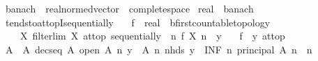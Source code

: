 \begin{isabellebody}
\isanewline
%
\endisadelimproof
\isanewline
{}\isamarkupfalse%
\ banach\ {\isacharequal}{\kern0pt}\ real{\isacharunderscore}{\kern0pt}normed{\isacharunderscore}{\kern0pt}vector\ {\isacharplus}{\kern0pt}\ complete{\isacharunderscore}{\kern0pt}space\isanewline
\isanewline
{}\isamarkupfalse%
\ real\ {\isacharcolon}{\kern0pt}{\isacharcolon}{\kern0pt}\ banach%
\isadelimproof
\ %
\endisadelimproof
%
\isatagproof
\isacommand{{\isachardot}{\kern0pt}{\isachardot}{\kern0pt}}\isamarkupfalse%
%
\endisatagproof
{\isafoldproof}%
%
\isadelimproof
%
\endisadelimproof
\isanewline
\isanewline
{}\isamarkupfalse%
\ tendsto{\isacharunderscore}{\kern0pt}at{\isacharunderscore}{\kern0pt}topI{\isacharunderscore}{\kern0pt}sequentially{\isacharcolon}{\kern0pt}\isanewline
\ \ \ f\ {\isacharcolon}{\kern0pt}{\isacharcolon}{\kern0pt}\ {\isachardoublequoteopen}real\ {\isasymRightarrow}\ {\isacharprime}{\kern0pt}b{\isacharcolon}{\kern0pt}{\isacharcolon}{\kern0pt}first{\isacharunderscore}{\kern0pt}countable{\isacharunderscore}{\kern0pt}topology{\isachardoublequoteclose}\isanewline
\ \ \ {\isacharasterisk}{\kern0pt}{\isacharcolon}{\kern0pt}\ {\isachardoublequoteopen}{\isasymAnd}X{\isachardot}{\kern0pt}\ filterlim\ X\ at{\isacharunderscore}{\kern0pt}top\ sequentially\ {\isasymLongrightarrow}\ {\isacharparenleft}{\kern0pt}{\isasymlambda}n{\isachardot}{\kern0pt}\ f\ {\isacharparenleft}{\kern0pt}X\ n{\isacharparenright}{\kern0pt}{\isacharparenright}{\kern0pt}\ {\isasymlonglonglongrightarrow}\ y{\isachardoublequoteclose}\isanewline
\ \ \ {\isachardoublequoteopen}{\isacharparenleft}{\kern0pt}f\ {\isasymlonglongrightarrow}\ y{\isacharparenright}{\kern0pt}\ at{\isacharunderscore}{\kern0pt}top{\isachardoublequoteclose}\isanewline
%
\isadelimproof
%
\endisadelimproof
%
\isatagproof
{}\isamarkupfalse%
\ {\isacharminus}{\kern0pt}\isanewline
\ \ \isamarkupfalse%
\ A\ \ A{\isacharcolon}{\kern0pt}\ {\isachardoublequoteopen}decseq\ A{\isachardoublequoteclose}\ {\isachardoublequoteopen}open\ {\isacharparenleft}{\kern0pt}A\ n{\isacharparenright}{\kern0pt}{\isachardoublequoteclose}\ {\isachardoublequoteopen}y\ {\isasymin}\ A\ n{\isachardoublequoteclose}\ {\isachardoublequoteopen}nhds\ y\ {\isacharequal}{\kern0pt}\ {\isacharparenleft}{\kern0pt}INF\ n{\isachardot}{\kern0pt}\ principal\ {\isacharparenleft}{\kern0pt}A\ n{\isacharparenright}{\kern0pt}{\isacharparenright}{\kern0pt}{\isachardoublequoteclose}\ \ n\isanewline
\ \ \ \ \isamarkupfalse%

\end{isabellebody}
